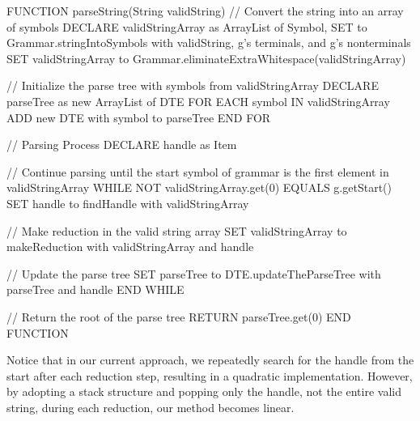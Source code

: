 \vspace{10pt}

\begin{codeblock}
    FUNCTION parseString(String validString)
    // Convert the string into an array of symbols
    DECLARE validStringArray as ArrayList of Symbol, SET to Grammar.stringIntoSymbols with validString, g's terminals, and g's nonterminals
    SET validStringArray to Grammar.eliminateExtraWhitespace(validStringArray)

    // Initialize the parse tree with symbols from validStringArray
    DECLARE parseTree as new ArrayList of DTE
    FOR EACH symbol IN validStringArray
    ADD new DTE with symbol to parseTree
    END FOR

    // Parsing Process
    DECLARE handle as Item

    // Continue parsing until the start symbol of grammar is the first element in validStringArray
    WHILE NOT validStringArray.get(0) EQUALS g.getStart()
    SET handle to findHandle with validStringArray

    // Make reduction in the valid string array
    SET validStringArray to makeReduction with validStringArray and handle

    // Update the parse tree
    SET parseTree to DTE.updateTheParseTree with parseTree and handle
    END WHILE

    // Return the root of the parse tree
    RETURN parseTree.get(0)
    END FUNCTION

\end{codeblock}


Notice that in our current approach, we repeatedly search for the handle from the start after each reduction step, resulting in a quadratic implementation. However, by adopting a stack structure and popping only the handle, not the entire valid string, during each reduction, our method becomes linear.